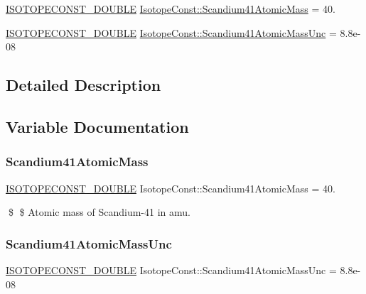 \begin{DoxyCompactItemize}
\item 
\mbox{\hyperlink{group___isotope_const-_macros_ga8f45a7272ce02c0b4c65c44636ed719a}{I\+S\+O\+T\+O\+P\+E\+C\+O\+N\+S\+T\+\_\+\+D\+O\+U\+B\+LE}} \mbox{\hyperlink{group___isotope_const-_scandium-_sc41_gaf1a6a46c245bd0966c753eaf3c59e6b2}{Isotope\+Const\+::\+Scandium41\+Atomic\+Mass}} = 40.
\item 
\mbox{\hyperlink{group___isotope_const-_macros_ga8f45a7272ce02c0b4c65c44636ed719a}{I\+S\+O\+T\+O\+P\+E\+C\+O\+N\+S\+T\+\_\+\+D\+O\+U\+B\+LE}} \mbox{\hyperlink{group___isotope_const-_scandium-_sc41_ga27af005ae261109b25462ec7b137cd61}{Isotope\+Const\+::\+Scandium41\+Atomic\+Mass\+Unc}} = 8.\+8e-\/08
\end{DoxyCompactItemize}


\subsection{Detailed Description}


\subsection{Variable Documentation}
\mbox{\label{group___isotope_const-_scandium-_sc41_gaf1a6a46c245bd0966c753eaf3c59e6b2}} 
\subsubsection{\texorpdfstring{Scandium41\+Atomic\+Mass}{Scandium41AtomicMass}}
{\footnotesize\ttfamily \mbox{\hyperlink{group___isotope_const-_macros_ga8f45a7272ce02c0b4c65c44636ed719a}{I\+S\+O\+T\+O\+P\+E\+C\+O\+N\+S\+T\+\_\+\+D\+O\+U\+B\+LE}} Isotope\+Const\+::\+Scandium41\+Atomic\+Mass = 40.}

\$ \$ Atomic mass of Scandium-\/41 in amu. \mbox{\label{group___isotope_const-_scandium-_sc41_ga27af005ae261109b25462ec7b137cd61}} 
\subsubsection{\texorpdfstring{Scandium41\+Atomic\+Mass\+Unc}{Scandium41AtomicMassUnc}}
{\footnotesize\ttfamily \mbox{\hyperlink{group___isotope_const-_macros_ga8f45a7272ce02c0b4c65c44636ed719a}{I\+S\+O\+T\+O\+P\+E\+C\+O\+N\+S\+T\+\_\+\+D\+O\+U\+B\+LE}} Isotope\+Const\+::\+Scandium41\+Atomic\+Mass\+Unc = 8.\+8e-\/08}

